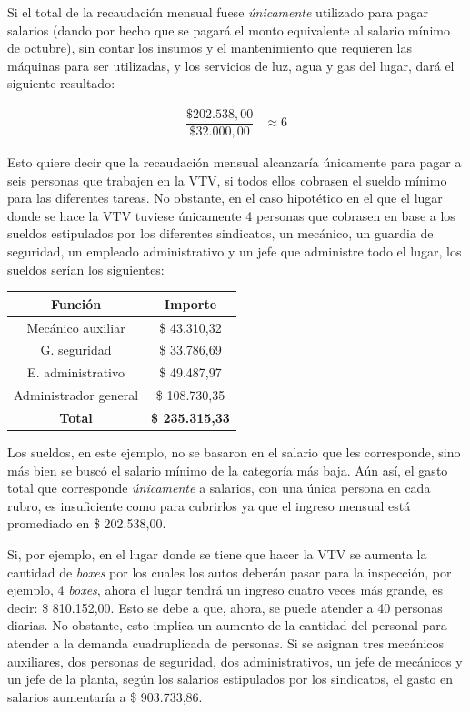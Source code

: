 \documentclass[12pt,a4paper,twoside]{book}
\begin{document}
Si el total de la recaudación mensual fuese \textit{únicamente} utilizado para pagar salarios (dando por hecho que se pagará el monto equivalente al salario mínimo de octubre), sin contar los insumos y el mantenimiento que requieren las máquinas para ser utilizadas, y los servicios de luz, agua y gas del lugar, dará el siguiente resultado:

\begin{align*}
\dfrac{\text{\$ } 202.538,00}{\text{\$ } 32.000,00} &\approx 6 
\end{align*}

Esto quiere decir que la recaudación mensual alcanzaría únicamente para pagar a seis personas que trabajen en la VTV, si todos ellos cobrasen el sueldo mínimo para las diferentes tareas. No obstante, en el caso hipotético en el que el lugar donde se hace la VTV tuviese únicamente 4 personas que cobrasen en base a los sueldos estipulados por los diferentes sindicatos, un mecánico, un guardia de seguridad, un empleado administrativo y un jefe que administre todo el lugar, los sueldos serían los siguientes:

\begin{tabular}{|c|c|}
\hline 
\textbf{Función} & \textbf{Importe} \\ 
\hline 
Mecánico auxiliar & \$ 43.310,32 \\ 
\hline 
G. seguridad & \$ 33.786,69 \\ 
\hline 
E. administrativo & \$ 49.487,97 \\ 
\hline 
Administrador general & \$ 108.730,35 \\ 
\hline 
\textbf{Total} & \textbf{\$ 235.315,33} \\ 
\hline 
\end{tabular}

Los sueldos, en este ejemplo, no se basaron en el salario que les corresponde, sino más bien se buscó el salario mínimo de la categoría más baja. Aún así, el gasto total que corresponde \textit{únicamente} a salarios, con una única persona en cada rubro, es insuficiente como para cubrirlos ya que el ingreso mensual está promediado en \$ 202.538,00.

Si, por ejemplo, en el lugar donde se tiene que hacer la VTV se aumenta la cantidad de \textit{boxes} por los cuales los autos deberán pasar para la inspección, por ejemplo, 4 \textit{boxes}, ahora el lugar tendrá un ingreso cuatro veces más grande, es decir: \$ 810.152,00. Esto se debe a que, ahora, se puede atender a 40 personas diarias. No obstante, esto implica un aumento de la cantidad del personal para atender a la demanda cuadruplicada de personas. Si se asignan tres mecánicos auxiliares, dos personas de seguridad, dos administrativos, un jefe de mecánicos y un jefe de la planta, según los salarios estipulados por los sindicatos, el gasto en salarios aumentaría a \$ 903.733,86.
\end{document}

